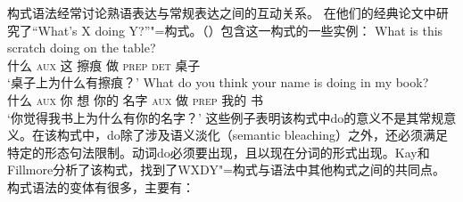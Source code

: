 构式语法经常讨论熟语表达与常规表达之间的互动关系。 \citet{KF99a}在他们的经典论文中研究了“What's X doing Y?”"=构式。（）包含这一构式的一些实例：
\eal
\ex 
\gll What is this scratch doing on the table?\\
      什么 \textsc{aux} 这 擦痕 做 \textsc{prep} \textsc{det} 桌子\\
\glt `桌子上为什么有擦痕？'
\ex 
\gll What do you think your name is doing in my book?\\
      什么 \textsc{aux} 你 想 你的 名字 \textsc{aux} 做 \textsc{prep} 我的 书\\
\glt `你觉得我书上为什么有你的名字？'
\zl
这些例子表明该构式中do的意义不是其常规意义。在该构式中，do除了涉及语义淡化（semantic bleaching）之外，还必须满足特定的形态句法限制。动词do必须要出现，且以现在分词的形式出现。Kay和Fillmore分析了该构式，找到了WXDY"=构式与语法中其他构式之间的共同点。
构式语法的变体有很多，主要有：

